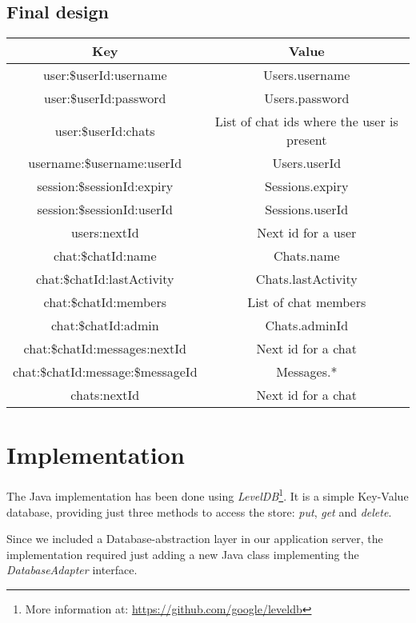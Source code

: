 \documentclass[10pt]{article}
\begin{document}
\subsection{Final design}
\begin{center}
\begin{tabular}{ | c | c | }
    \hline
    \textbf{Key} & \textbf{Value} \\\hline
    user:\$userId:username & Users.username \\\hline
    user:\$userId:password & Users.password \\\hline
    user:\$userId:chats & List of chat ids where the user is present \\\hline
    username:\$username:userId & Users.userId \\\hline
    session:\$sessionId:expiry & Sessions.expiry \\\hline
    session:\$sessionId:userId & Sessions.userId \\\hline
    users:nextId & Next id for a user \\\hline
    chat:\$chatId:name & Chats.name \\\hline
    chat:\$chatId:lastActivity & Chats.lastActivity \\\hline
    chat:\$chatId:members & List of chat members \\\hline
    chat:\$chatId:admin & Chats.adminId\\\hline
    chat:\$chatId:messages:nextId & Next id for a chat \\\hline
    chat:\$chatId:message:\$messageId & Messages.* \\\hline
    chats:nextId & Next id for a chat \\\hline
\end{tabular}
\end{center}

\section{Implementation}
The Java implementation has been done using \emph{LevelDB}\footnote{More information
at: \url{https://github.com/google/leveldb}}. It is a simple Key-Value database, 
providing just three methods to access the store: \emph{put}, \emph{get} and 
\emph{delete}.

Since we included a Database-abstraction layer in our application server, the 
implementation required just adding a new Java class implementing the 
\emph{DatabaseAdapter} interface.
\end{document}
